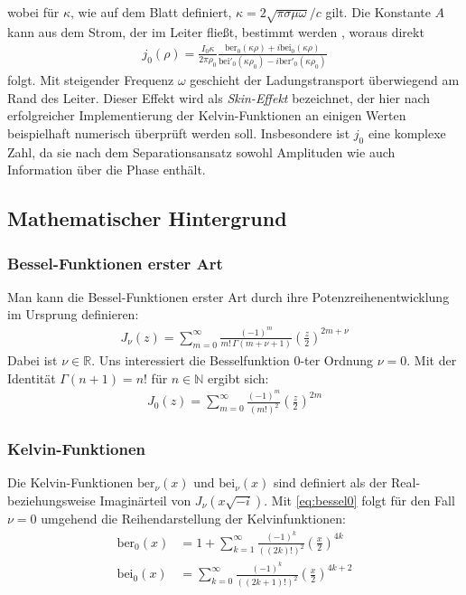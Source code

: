 \documentclass[10pt,a4paper]{article}
\begin{document}
wobei für $\kappa$, wie auf dem Blatt definiert, $\kappa = 2 \sqrt{\pi \sigma \mu \omega}/c$ gilt.
Die Konstante $A$ kann aus dem Strom, der im Leiter fließt, bestimmt werden \cite{kazimierczuk}, woraus direkt
\begin{align}
	j_0(\rho) = \frac{I_0 \kappa}{2\pi\rho_0}\frac{\mathrm{ber}_0(\kappa\rho)+i \mathrm{bei}_0(\kappa\rho)}{\mathrm{bei}'_0(\kappa\rho_0)-i\mathrm{ber}'_0(\kappa\rho_0)}
\end{align}
folgt. Mit steigender Frequenz $\omega$ geschieht der Ladungstransport überwiegend am Rand des Leiter. Dieser Effekt wird als \emph{Skin-Effekt} bezeichnet, der hier nach erfolgreicher Implementierung der Kelvin-Funktionen an einigen Werten beispielhaft numerisch überprüft werden soll. Insbesondere ist $j_0$ eine komplexe Zahl, da sie nach dem Separationsansatz sowohl Amplituden wie auch Information über die Phase enthält.


\subsection{Mathematischer Hintergrund}

\subsubsection{Bessel-Funktionen erster Art}

Man kann die Bessel-Funktionen erster Art durch ihre Potenzreihenentwicklung im Ursprung definieren:
\begin{align}
	J_\nu(z) = \sum^{\infty}_{m=0} \frac{\left( -1 \right)^m}{m! \, \Gamma(m + \nu + 1)} \left(\frac{z}{2}\right)^{2m+\nu}
\end{align}
Dabei ist $\nu \in \mathbb{R}$. Uns interessiert die Besselfunktion 0-ter Ordnung $\nu = 0$.
Mit der Identität $\Gamma(n+1) = n!$ für $n \in \mathbb{N}$ ergibt sich:
\begin{align}
	\label{eq:bessel0}
	J_0(z) = \sum^{\infty}_{m=0} \frac{\left( -1 \right)^m}{\left( m! \right)^2} \left( \frac{z}{2} \right)^{2m}
\end{align}

\subsubsection{Kelvin-Funktionen}

Die Kelvin-Funktionen $\mathrm{ber}_\nu(x)$ und $\mathrm{bei}_\nu(x)$ sind definiert als der Real-
beziehungsweise Imaginärteil von $J_\nu(x \sqrt{-i} )$. Mit \ref{eq:bessel0}
folgt für den Fall $\nu = 0$ umgehend die Reihendarstellung der Kelvinfunktionen:
\begin{align}
	\mathrm{ber}_0(x) &= 1 + \sum^{\infty}_{k=1} \frac{\left( -1 \right)^k}{\left( \left(2k\right)! \right)^2} \left( \frac{x}{2} \right)^{4k} \label{eq:berpotenzreihe}\\
	\mathrm{bei}_0(x) &= \sum^{\infty}_{k=0} \frac{\left( -1 \right)^k}{\left( \left(2k+1\right)! \right)^2} \left( \frac{x}{2} \right)^{4k+2}\label{eq:beipotenzreihe}
\end{align}
\end{document}
